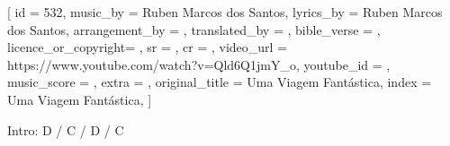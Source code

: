 [
    id                  = {532},
    music_by            = {Ruben Marcos dos Santos}, %
    lyrics_by           = {Ruben Marcos dos Santos}, %
    arrangement_by      = {}, %
    translated_by       = {}, %
    bible_verse         = {},
    licence_or_copyright= {},
    sr                  = {},
    cr                  = {},
    video_url           = {https://www.youtube.com/watch?v=Qld6Q1jmY_o}, %
    youtube_id          = {}, %
    music_score         = {}, %
    extra               = {},
    original_title      = {Uma Viagem Fantástica}, %
    index               = {Uma Viagem Fantástica},
]

\beginverse
Intro:
D / C / D / C
\endverse

\beginverse

